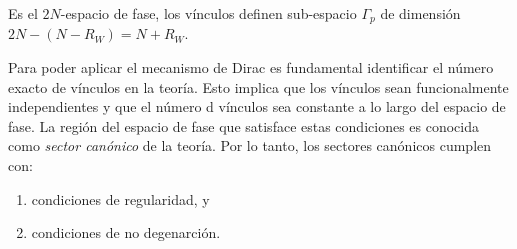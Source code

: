 Es el $2N$-espacio de fase, los vínculos definen sub-espacio $\Gamma_p $ de dimensión $2N-(N-R_W)=N+R_W$.

Para poder aplicar el mecanismo de Dirac es fundamental identificar el número exacto de vínculos en la teoría. Esto implica que los vínculos sean funcionalmente independientes y que el número d vínculos sea constante a lo largo del espacio de fase. La región del espacio de fase que satisface estas condiciones es conocida como \textit{sector canónico} de la teoría. Por lo tanto, los sectores canónicos cumplen con:
\begin{enumerate}
	\item condiciones de regularidad, y
	\item condiciones de no degenarción.
\end{enumerate}






































